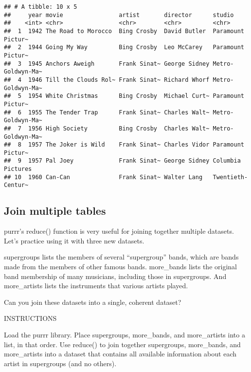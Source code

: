 \documentclass[]{article}
\newenvironment{Shaded}{\begin{snugshade}}{\end{snugshade}}
\newcommand{\KeywordTok}[1]{\textcolor[rgb]{0.13,0.29,0.53}{\textbf{#1}}}
\newcommand{\DataTypeTok}[1]{\textcolor[rgb]{0.13,0.29,0.53}{#1}}
\newcommand{\StringTok}[1]{\textcolor[rgb]{0.31,0.60,0.02}{#1}}
\newcommand{\CommentTok}[1]{\textcolor[rgb]{0.56,0.35,0.01}{\textit{#1}}}
\newcommand{\OperatorTok}[1]{\textcolor[rgb]{0.81,0.36,0.00}{\textbf{#1}}}
\newcommand{\NormalTok}[1]{#1}
\begin{document}
\begin{verbatim}
## # A tibble: 10 x 5
##     year movie                artist       director      studio           
##    <int> <chr>                <chr>        <chr>         <chr>            
##  1  1942 The Road to Morocco  Bing Crosby  David Butler  Paramount Pictur~
##  2  1944 Going My Way         Bing Crosby  Leo McCarey   Paramount Pictur~
##  3  1945 Anchors Aweigh       Frank Sinat~ George Sidney Metro-Goldwyn-Ma~
##  4  1946 Till the Clouds Rol~ Frank Sinat~ Richard Whorf Metro-Goldwyn-Ma~
##  5  1954 White Christmas      Bing Crosby  Michael Curt~ Paramount Pictur~
##  6  1955 The Tender Trap      Frank Sinat~ Charles Walt~ Metro-Goldwyn-Ma~
##  7  1956 High Society         Bing Crosby  Charles Walt~ Metro-Goldwyn-Ma~
##  8  1957 The Joker is Wild    Frank Sinat~ Charles Vidor Paramount Pictur~
##  9  1957 Pal Joey             Frank Sinat~ George Sidney Columbia Pictures
## 10  1960 Can-Can              Frank Sinat~ Walter Lang   Twentieth-Centur~
\end{verbatim}

\subsection{Join multiple tables}\label{join-multiple-tables}

purrr's reduce() function is very useful for joining together multiple
datasets. Let's practice using it with three new datasets.

supergroups lists the members of several ``supergroup'' bands, which are
bands made from the members of other famous bands. more\_bands lists the
original band membership of many musicians, including those in
supergroups. And more\_artists lists the instruments that various
artists played.

Can you join these datasets into a single, coherent dataset?

INSTRUCTIONS

Load the purrr library. Place supergroups, more\_bands, and
more\_artists into a list, in that order. Use reduce() to join together
supergroups, more\_bands, and more\_artists into a dataset that contains
all available information about each artist in supergroups (and no
others).

\begin{Shaded}
\end{Shaded}
\end{document}
